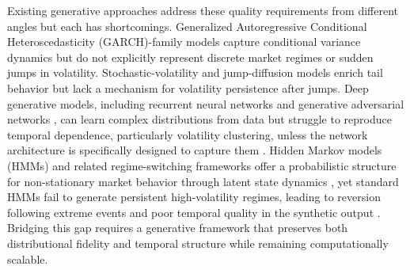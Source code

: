 Existing generative approaches address these quality requirements from different angles but each has shortcomings. Generalized Autoregressive Conditional Heteroscedasticity (GARCH)-family models \cite{engle_1982, bollerslev_garch_1986} capture conditional variance dynamics but do not explicitly represent discrete market regimes or sudden jumps in volatility. Stochastic-volatility and jump-diffusion models \cite{heston_stochastic_1993, merton_jump_1976} enrich tail behavior but lack a mechanism for volatility persistence after jumps. Deep generative models, including recurrent neural networks \cite{hochreiter_lstm_1997, fischer_krauss_2018} and generative adversarial networks \cite{takahashi_2019, kwon_can_2024, yoon_timegan_2019}, can learn complex distributions from data but struggle to reproduce temporal dependence, particularly volatility clustering, unless the network architecture is specifically designed to capture them \cite{stenger_jdiq_ts_synthesis_2024}. Hidden Markov models (HMMs) and related regime-switching frameworks offer a probabilistic structure for non-stationary market behavior through latent state dynamics \cite{rabiner_introduction_1986}, yet standard HMMs fail to generate persistent high-volatility regimes, leading to reversion following extreme events and poor temporal quality in the synthetic output \cite{ryden_stylized_1998, bulla_stylized_2006}. Bridging this gap requires a generative framework that preserves both distributional fidelity and temporal structure while remaining computationally scalable.

